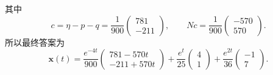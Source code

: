\documentclass[11pt,a4paper]{ctexart}
\newcommand{\xx}{\boldsymbol{x}}
\begin{document}
其中
\[
c=\eta-p-q=\frac1{900}\begin{pmatrix}781\\-211\end{pmatrix},\qquad
Nc=\frac1{900}\begin{pmatrix}-570\\570\end{pmatrix}.
\]
所以最终答案为
\[
\boxed{\xx(t)=\frac{e^{-4t}}{900}
\begin{pmatrix}781-570t\\-211+570t\end{pmatrix}
+\frac{e^t}{25}\begin{pmatrix}4\\1\end{pmatrix}
+\frac{e^{2t}}{36}\begin{pmatrix}-1\\7\end{pmatrix}.}
\]

\newpage
\end{document}
